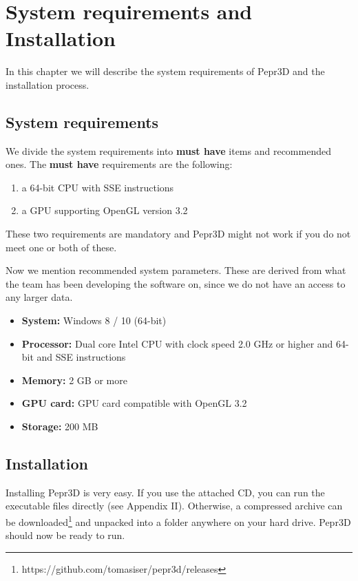 \chapter{System requirements and Installation}

In this chapter we will describe the system requirements of Pepr3D and the installation process.

\section{System requirements}

We divide the system requirements into \textbf{must have} items and recommended ones. The \textbf{must have} requirements are the following:

\begin{enumerate}
\item a 64-bit CPU with SSE instructions
\item a GPU supporting OpenGL version 3.2
\end{enumerate}

These two requirements are mandatory and Pepr3D might not work if you do not meet one or both of these.

Now we mention recommended system parameters. These are derived from what the team has been developing the software on, since we do not have an access to any larger data.

\begin{itemize}
\item \textbf{System:} Windows 8 / 10 (64-bit)
\item \textbf{Processor:} Dual core Intel CPU with clock speed 2.0 GHz or higher and 64-bit and SSE instructions
\item \textbf{Memory:} 2 GB or more
\item \textbf{GPU card:} GPU card compatible with OpenGL 3.2
\item \textbf{Storage:} 200 MB
\end{itemize}

\section{Installation}

Installing Pepr3D is very easy.
If you use the attached CD, you can run the executable files directly (see Appendix II).
Otherwise, a compressed archive can be downloaded\footnote{https://github.com/tomasiser/pepr3d/releases} and unpacked into a folder anywhere on your hard drive.
Pepr3D should now be ready to run.